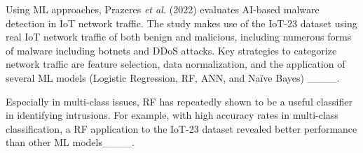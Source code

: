 
Using ML approaches, Prazeres \textit{et al.} (2022) evaluates AI-based malware detection in IoT network traffic. The study makes use of the IoT-23 dataset using real IoT network traffic of both benign and malicious, including numerous forms of malware including botnets and DDoS attacks. Key strategies to categorize network traffic are feature selection, data normalization, and the application of several ML models (Logistic Regression, RF, ANN, and Naïve Bayes) ____. 


Especially in multi-class issues, RF has repeatedly shown to be a useful classifier in identifying intrusions. For example, with high accuracy rates in multi-class classification, a RF application to the IoT-23 dataset revealed better performance than other ML models____.

